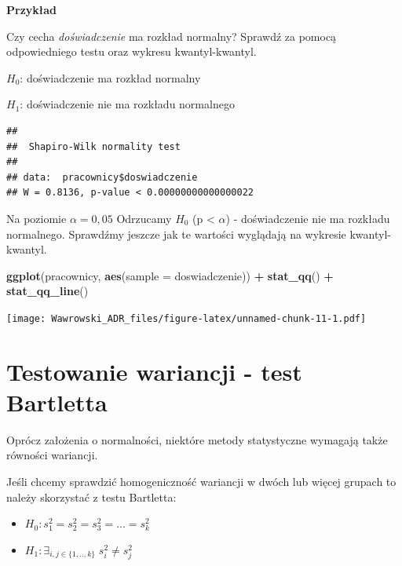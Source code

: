 \documentclass[]{book}
\newenvironment{Shaded}{\begin{snugshade}}{\end{snugshade}}
\newcommand{\DataTypeTok}[1]{\textcolor[rgb]{0.13,0.29,0.53}{#1}}
\newcommand{\KeywordTok}[1]{\textcolor[rgb]{0.13,0.29,0.53}{\textbf{#1}}}
\newcommand{\NormalTok}[1]{#1}
\newcommand{\OperatorTok}[1]{\textcolor[rgb]{0.81,0.36,0.00}{\textbf{#1}}}
\newcommand{\StringTok}[1]{\textcolor[rgb]{0.31,0.60,0.02}{#1}}
\providecommand{\tightlist}{%
  \setlength{\itemsep}{0pt}\setlength{\parskip}{0pt}}
\begin{document}
\textbf{Przykład}

Czy cecha \emph{doświadczenie} ma rozkład normalny? Sprawdź za pomocą odpowiedniego testu oraz wykresu kwantyl-kwantyl.

\(H_0\): doświadczenie ma rozkład normalny

\(H_1\): doświadczenie nie ma rozkładu normalnego

\begin{Shaded}
\end{Shaded}

\begin{verbatim}
## 
##  Shapiro-Wilk normality test
## 
## data:  pracownicy$doswiadczenie
## W = 0.8136, p-value < 0.00000000000000022
\end{verbatim}

Na poziomie \(\alpha = 0,05\) Odrzucamy \(H_0\) (p \textless{} \(\alpha\)) - doświadczenie nie ma rozkładu normalnego. Sprawdźmy jeszcze jak te wartości wyglądają na wykresie kwantyl-kwantyl.

\begin{Shaded}
\begin{Highlighting}[]
\KeywordTok{ggplot}\NormalTok{(pracownicy, }\KeywordTok{aes}\NormalTok{(}\DataTypeTok{sample =}\NormalTok{ doswiadczenie)) }\OperatorTok{+}
\StringTok{  }\KeywordTok{stat_qq}\NormalTok{() }\OperatorTok{+}
\StringTok{  }\KeywordTok{stat_qq_line}\NormalTok{()}
\end{Highlighting}
\end{Shaded}

\texttt{[image: Wawrowski\_ADR\_files/figure-latex/unnamed-chunk-11-1.pdf]}

\hypertarget{testowanie-wariancji---test-bartletta}{%
\section{Testowanie wariancji - test Bartletta}\label{testowanie-wariancji---test-bartletta}}

Oprócz założenia o normalności, niektóre metody statystyczne wymagają także równości wariancji.

Jeśli chcemy sprawdzić homogeniczność wariancji w dwóch lub więcej grupach to należy skorzystać z testu Bartletta:

\begin{itemize}
\tightlist
\item
  \(H_0: s^2_1=s^2_2= s^2_3 =...=s^2_k\)
\item
  \(H_1: \exists_{i,j\in\{1,..,k\}} \; s^2_i \neq s^2_j\)
\end{itemize}
\end{document}
